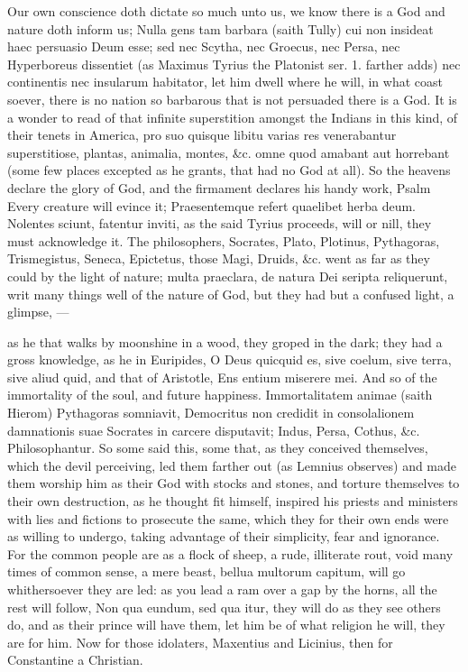 {Our own conscience doth dictate so much unto us, we know there is a God
and nature doth inform us; Nulla gens tam barbara (saith Tully) cui non
insideat haec persuasio Deum esse; sed nec Scytha, nec Groecus, nec
Persa, nec Hyperboreus dissentiet (as Maximus Tyrius the Platonist ser.
1. farther adds) nec continentis nec insularum habitator, let him dwell
where he will, in what coast soever, there is no nation so barbarous
that is not persuaded there is a God. It is a wonder to read of that
infinite superstition amongst the Indians in this kind, of their tenets
in America, pro suo quisque libitu varias res venerabantur
superstitiose, plantas, animalia, montes, \&c. omne quod amabant aut
horrebant (some few places excepted as he grants, that had no God at
all). So the heavens declare the glory of God, and the firmament
declares his handy work, Psalm  Every creature will evince it;
Praesentemque refert quaelibet herba deum. Nolentes sciunt, fatentur
inviti, as the said Tyrius proceeds, will or nill, they must
acknowledge it. The philosophers, Socrates, Plato, Plotinus,
Pythagoras, Trismegistus, Seneca, Epictetus, those Magi, Druids, \&c.
went as far as they could by the light of nature; multa
praeclara, de natura Dei seripta reliquerunt, writ many things well of
the nature of God, but they had but a confused light, a glimpse,
---

as he that walks by moonshine in a wood, they groped in the dark; they
had a gross knowledge, as he in Euripides, O Deus quicquid es, sive
coelum, sive terra, sive aliud quid, and that of Aristotle, Ens entium
miserere mei. And so of the immortality of the soul, and future
happiness. Immortalitatem animae (saith Hierom) Pythagoras somniavit,
Democritus non credidit in consolalionem damnationis suae Socrates in
carcere disputavit; Indus, Persa, Cothus, \&c. Philosophantur. So some
said this, some that, as they conceived themselves, which the devil
perceiving, led them farther out (as Lemnius observes) and made
them worship him as their God with stocks and stones, and torture
themselves to their own destruction, as he thought fit himself,
inspired his priests and ministers with lies and fictions to prosecute
the same, which they for their own ends were as willing to undergo,
taking advantage of their simplicity, fear and ignorance. For the
common people are as a flock of sheep, a rude, illiterate rout, void
many times of common sense, a mere beast, bellua multorum capitum, will
go whithersoever they are led: as you lead a ram over a gap by the
horns, all the rest will follow, Non qua eundum, sed qua itur,
they will do as they see others do, and as their prince will have them,
let him be of what religion he will, they are for him. Now for those
idolaters, Maxentius and Licinius, then for Constantine a Christian.

}
